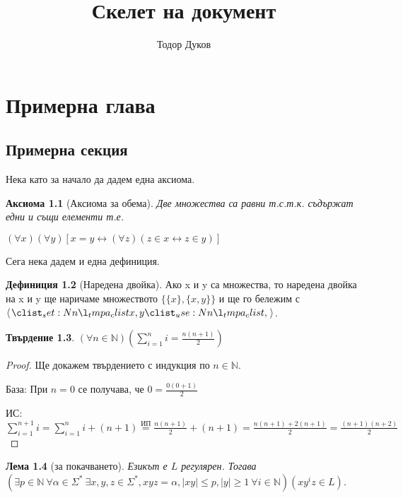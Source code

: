 \documentclass[11pt, a5paper]{report}
\title{Скелет на документ}
\author{Тодор Дуков}
\date{}
\theoremstyle{definition}
\newtheorem{definition}{Дефиниция}[section]
\theoremstyle{plain}
\newtheorem{claim}[definition]{Твърдение}
\newtheorem{axiom}[definition]{Аксиома}
\newtheorem{lemma}[definition]{Лема}
\theoremstyle{remark}
\theoremstyle{definition}
\begin{document}
\maketitle
\tableofcontents
\chapter{Примерна глава}
\section{Примерна секция}

Нека като за начало да дадем една аксиома.

\begin{axiom}[Аксиома за обема]
    Две множества са равни т.с.т.к. съдържат едни и същи елементи т.е.

    \centerline{$(\forall x) (\forall y) [x = y \leftrightarrow (\forall z)(z \in x \leftrightarrow z \in y)]$}
\end{axiom}

Сега нека дадем и една дефиниция.

\begin{definition}[Наредена двойка]
    Ако x и y са множества, то наредена двойка на x и y ще наричаме множеството $\{\{x\}, \{x, y\}\}$ и ще го бележим с $\opair{x, y}$.
\end{definition}

\begin{claim}
    $( \forall n \in \mathbb{N} ) ( \displaystyle\sum_{i=1}^{n}i = \frac{n(n+1)}{2} )$
\end{claim}

\begin{proof}
    Ще докажем твърдението с индукция по $n \in \mathbb{N}$.

    База: При $n = 0$ се получава, че $0 = \frac{0(0+1)}{2}$ \checkmark

    ИС: $\displaystyle\sum_{i=1}^{n+1}i = \displaystyle\sum_{i=1}^{n}i + (n + 1) \overset{\text{ИП}}{=} \frac{n(n+1)}{2} + (n + 1) = \frac{n(n+1) + 2(n+1)}{2} = \frac{(n+1)(n+2)}{2}$
\end{proof}

\begin{lemma}[за покачването]
    Езикът е $L$ регулярен.
    Тогава $(\exists p \in \mathbb{N} \: \forall \alpha \in \Sigma^* \: \exists x, y, z \in \Sigma^*, xyz = \alpha, |xy| \leq p, |y| \geq 1 \: \forall i \in \mathbb{N}) (xy^iz \in L)$.
\end{lemma}
\end{document}
